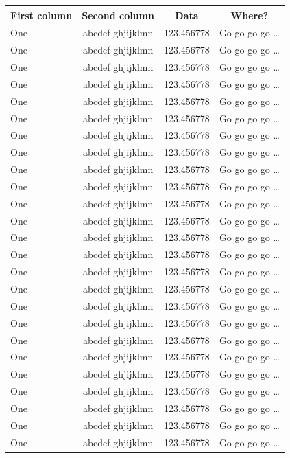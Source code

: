 \documentclass[phd]{ndsu-thesis-2022}
\begin{document}
{\begin{longtable}{l c c c }
        \midrule
	First column & Second column & Data & Where?\\
        \midrule
        \endhead
One & abcdef ghjijklmn & 123.456778  & Go go go go \ldots \\
One & abcdef ghjijklmn & 123.456778  & Go go go go \ldots \\
One & abcdef ghjijklmn & 123.456778  & Go go go go \ldots \\
One & abcdef ghjijklmn & 123.456778  & Go go go go \ldots \\
One & abcdef ghjijklmn & 123.456778  & Go go go go \ldots \\
One & abcdef ghjijklmn & 123.456778  & Go go go go \ldots \\
One & abcdef ghjijklmn & 123.456778  & Go go go go \ldots \\
One & abcdef ghjijklmn & 123.456778  & Go go go go \ldots \\
One & abcdef ghjijklmn & 123.456778  & Go go go go \ldots \\
One & abcdef ghjijklmn & 123.456778  & Go go go go \ldots \\
One & abcdef ghjijklmn & 123.456778  & Go go go go \ldots \\
One & abcdef ghjijklmn & 123.456778  & Go go go go \ldots \\
One & abcdef ghjijklmn & 123.456778  & Go go go go \ldots \\
One & abcdef ghjijklmn & 123.456778  & Go go go go \ldots \\
One & abcdef ghjijklmn & 123.456778  & Go go go go \ldots \\
One & abcdef ghjijklmn & 123.456778  & Go go go go \ldots \\
One & abcdef ghjijklmn & 123.456778  & Go go go go \ldots \\
One & abcdef ghjijklmn & 123.456778  & Go go go go \ldots \\
One & abcdef ghjijklmn & 123.456778  & Go go go go \ldots \\
One & abcdef ghjijklmn & 123.456778  & Go go go go \ldots \\
One & abcdef ghjijklmn & 123.456778  & Go go go go \ldots \\
One & abcdef ghjijklmn & 123.456778  & Go go go go \ldots \\
One & abcdef ghjijklmn & 123.456778  & Go go go go \ldots \\
One & abcdef ghjijklmn & 123.456778  & Go go go go \ldots \\
One & abcdef ghjijklmn & 123.456778  & Go go go go \ldots \\

\end{longtable}}
\end{document}
